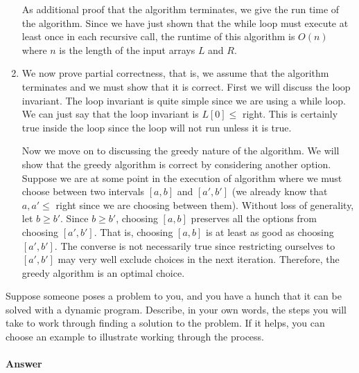 \documentclass{article}
\begin{document}
\begin{enumerate}
    As additional proof that the algorithm terminates, we give the run time of the algorithm.
    Since we have just shown that the while loop must execute at least once in each recursive call, the runtime of this algorithm is $O(n)$ where $n$ is the length of the input arrays $L$ and $R$.
    \item We now prove partial correctness, that is, we assume that the algorithm terminates and we must show that it is correct.
    First we will discuss the loop invariant.
    The loop invariant is quite simple since we are using a while loop.
    We can just say that the loop invariant is $L[0] \leq$ right.
    This is certainly true inside the loop since the loop will not run unless it is true.

    Now we move on to discussing the greedy nature of the algorithm.
    We will show that the greedy algorithm is correct by considering another option.
    Suppose we are at some point in the execution of algorithm where we must choose between two intervals $[a,b]$ and $[a',b']$ (we already know that $a,a' \leq $ right since we are choosing between them).
    Without loss of generality, let $b \geq b'$.
    Since $b \geq b'$, choosing $[a,b]$ preserves all the options from choosing $[a',b']$.
    That is, choosing $[a,b]$ is at least as good as choosing $[a',b']$.
    The converse is not necessarily true since restricting ourselves to $[a',b']$ may very well exclude choices in the next iteration.
    Therefore, the greedy algorithm is an optimal choice.
\end{enumerate}


\nextprob
{}

Suppose someone poses a problem to you, and you have a hunch that it can be
solved with a dynamic program.  Describe, in your own words, the steps you will
take to work through finding a solution to the problem.  If it helps, you can
choose an example to illustrate working through the process.

\paragraph{Answer}

\end{document}
